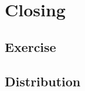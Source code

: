 \section{Closing}

\subsection{Exercise}
\frameready{
	
}

\subsection{Distribution}
\frameready{
	
}
